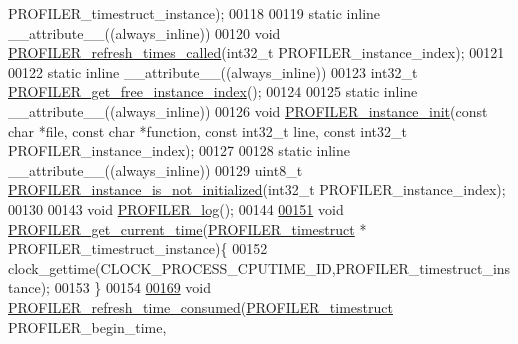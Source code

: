 \begin{DoxyCode}
      PROFILER\_timestruct\_instance);
00118 
00119 static inline \_\_attribute\_\_((always\_inline))
00120 \textcolor{keywordtype}{void} \hyperlink{_p_r_o_f_i_l_i_n_g__tools_8h_a2629430c71701c51e4c8897a61cd0edb}{PROFILER_refresh_times_called}(int32\_t PROFILER\_instance\_index);
00121 
00122 static inline \_\_attribute\_\_((always\_inline))
00123 int32\_t \hyperlink{_p_r_o_f_i_l_i_n_g__tools_8h_a279e6b70c0935894ab8b2f3c2db2cf78}{PROFILER_get_free_instance_index}();
00124 
00125 static inline \_\_attribute\_\_((always\_inline))
00126 \textcolor{keywordtype}{void} \hyperlink{_p_r_o_f_i_l_i_n_g__tools_8h_ab98613156719567b3aab5f675c195f92}{PROFILER_instance_init}(const \textcolor{keywordtype}{char} *file, const \textcolor{keywordtype}{char} *function, const 
      int32\_t line, const int32\_t PROFILER\_instance\_index);
00127 
00128 static inline \_\_attribute\_\_((always\_inline))
00129 uint8\_t \hyperlink{_p_r_o_f_i_l_i_n_g__tools_8h_acf37348ac7f1743ce5ccb80ac04c4944}{PROFILER_instance_is_not_initialized}(int32\_t PROFILER\_instance\_index);
00130 
00143 \textcolor{keywordtype}{void} \hyperlink{group___xD0_x9F_xD0_xBE_xD1_x80_xD1_x82_xD0_xB8_xD1_x80_xD1_x83_xD0_xB5_xD0_xBC_xD0_xB0_xD1_x8F_2ef1b31e26d7139e4bfe94879d1322e3_ga2f57ecff908155818a48144e366f7c57}{PROFILER_log}();
00144 
\hypertarget{_p_r_o_f_i_l_i_n_g__tools_8h_source_l00151}{}\hyperlink{group___xD0_x9F_xD0_xBE_xD1_x80_xD1_x82_xD0_xB8_xD1_x80_xD1_x83_xD0_xB5_xD0_xBC_xD0_xB0_xD1_x8F_2ef1b31e26d7139e4bfe94879d1322e3_ga106b837099d8b52043148fa42592608b}{00151} \textcolor{keywordtype}{void} \hyperlink{group___xD0_x9F_xD0_xBE_xD1_x80_xD1_x82_xD0_xB8_xD1_x80_xD1_x83_xD0_xB5_xD0_xBC_xD0_xB0_xD1_x8F_2ef1b31e26d7139e4bfe94879d1322e3_ga106b837099d8b52043148fa42592608b}{PROFILER_get_current_time}(\hyperlink{group___xD0_x9F_xD0_xBE_xD1_x80_xD1_x82_xD0_xB8_xD1_x80_xD1_x83_xD0_xB5_xD0_xBC_xD0_xB0_xD1_x8F_2ef1b31e26d7139e4bfe94879d1322e3_gae02193769f3b21a09fc0d5035e566a75}{PROFILER_timestruct} *
      PROFILER\_timestruct\_instance)\{
00152         clock\_gettime(CLOCK\_PROCESS\_CPUTIME\_ID,PROFILER\_timestruct\_instance);
00153 \}
00154 
\hypertarget{_p_r_o_f_i_l_i_n_g__tools_8h_source_l00169}{}\hyperlink{group___xD0_x9F_xD0_xBE_xD1_x80_xD1_x82_xD0_xB8_xD1_x80_xD1_x83_xD0_xB5_xD0_xBC_xD0_xB0_xD1_x8F_2ef1b31e26d7139e4bfe94879d1322e3_ga0072e0d84e203ad6499be54f4b6e14ee}{00169} \textcolor{keywordtype}{void} \hyperlink{group___xD0_x9F_xD0_xBE_xD1_x80_xD1_x82_xD0_xB8_xD1_x80_xD1_x83_xD0_xB5_xD0_xBC_xD0_xB0_xD1_x8F_2ef1b31e26d7139e4bfe94879d1322e3_ga0072e0d84e203ad6499be54f4b6e14ee}{PROFILER_refresh_time_consumed}(\hyperlink{group___xD0_x9F_xD0_xBE_xD1_x80_xD1_x82_xD0_xB8_xD1_x80_xD1_x83_xD0_xB5_xD0_xBC_xD0_xB0_xD1_x8F_2ef1b31e26d7139e4bfe94879d1322e3_gae02193769f3b21a09fc0d5035e566a75}{PROFILER_timestruct} PROFILER\_begin\_time, 

\end{DoxyCode}

